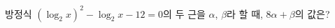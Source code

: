 방정식 $(\log_2 x)^2-\log_2 x-12=0$의 두 근을 $\alpha$, $\beta$라 할 때, $8\alpha+\beta$의 값은? \dmcondfill{$\alpha<\beta$}{}
